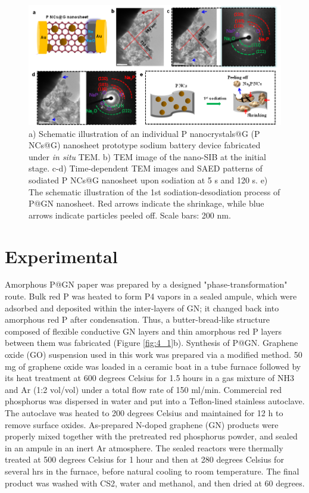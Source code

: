 \begin{figure}  
\includegraphics[width=320pt,angle=0]{figures/figure4_s3}
\caption[Layered structure design]
{a) Schematic illustration of an individual P nanocrystals@G (P NCs@G) nanosheet prototype sodium battery device fabricated under {\em in situ} TEM. b) TEM image of the nano-SIB at the initial stage. c-d) Time-dependent TEM images and SAED patterns of sodiated P NCs@G nanosheet upon sodiation at 5 s and 120 s. e) The schematic illustration of the 1st sodiation-desodiation process of P@GN nanosheet. Red arrows indicate the shrinkage, while blue arrows indicate particles peeled off. Scale bars: 200 nm. 
\label{fig:4_s3}}
\end{figure}

\section{Experimental}
Amorphous P@GN paper was prepared by a designed "phase-transformation" route. Bulk red P was heated to form P4 vapors in a sealed ampule, which were adsorbed and deposited within the inter-layers of GN; it changed back into amorphous red P after condensation.\cite{Roth1947b} Thus, a butter-bread-like structure composed of flexible conductive GN layers and thin amorphous red P layers between them was fabricated (Figure \ref{fig:4_1}b). 
Synthesis of P@GN. Graphene oxide (GO) suspension used in this work was prepared via a modified method. 50 mg of graphene oxide was loaded in a ceramic boat in a tube furnace followed by its heat treatment at 600 degrees Celsius for 1.5 hours in a gas mixture of NH3 and Ar (1:2 vol/vol) under a total flow rate of 150 ml/min. Commercial red phosphorus was dispersed in water and put into a Teflon-lined stainless autoclave. The autoclave was heated to 200 degrees Celsius and maintained for 12 h to remove surface oxides. As-prepared N-doped graphene (GN) products were properly mixed together with the pretreated red phosphorus powder, and sealed in an ampule in an inert Ar atmosphere. The sealed reactors were thermally treated at 500 degrees Celsius for 1 hour and then at 280 degrees Celsius for several hrs in the furnace, before natural cooling to room temperature. The final product was washed with CS2, water and methanol, and then dried at 60 degrees.\\

